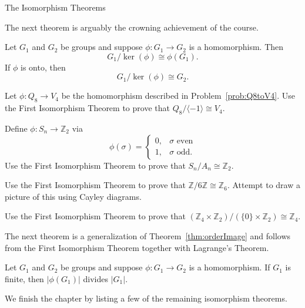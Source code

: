 \begin{section}{The Isomorphism Theorems}

The next theorem is arguably the crowning achievement of the course.

\begin{theorem}
Let $G_1$ and $G_2$ be groups and suppose $\phi:G_1\to G_2$ is a homomorphism. Then
\[
G_1/\ker(\phi)\cong \phi(G_1).
\]
If $\phi$ is onto, then
\[
G_1/\ker(\phi)\cong G_2.
\]
\end{theorem}

\begin{problem}
Let $\phi:Q_8\to V_4$ be the homomorphism described in Problem~\ref{prob:Q8toV4}. Use the First Isomorphism Theorem to prove that $Q_8/\langle-1\rangle\cong V_4$.
\end{problem}

\begin{problem}
Define $\phi:S_n\to \mathbb{Z}_2$ via
\[
\phi(\sigma)=\begin{cases}
0, & \sigma \text{ even}\\
1, & \sigma \text{ odd}.
\end{cases}
\]
Use the First Isomorphism Theorem to prove that $S_n/A_n\cong \mathbb{Z}_2$.
\end{problem}

\begin{problem}
Use the First Isomorphism Theorem to prove that $\mathbb{Z}/6\mathbb{Z}\cong \mathbb{Z}_6$.  Attempt to draw a picture of this using Cayley diagrams.
\end{problem}

\begin{problem}
Use the First Isomorphism Theorem to prove that $(\mathbb{Z}_4\times \mathbb{Z}_2)/(\{0\}\times \mathbb{Z}_2)\cong \mathbb{Z}_4$.
\end{problem}

The next theorem is a generalization of Theorem~\ref{thm:orderImage} and follows from the First Isomorphism Theorem together with Lagrange's Theorem.

\begin{theorem}
Let $G_1$ and $G_2$ be groups and suppose $\phi:G_1\to G_2$ is a homomorphism. If $G_1$ is finite, then $|\phi(G_1)|$ divides $|G_1|$.
\end{theorem}

We finish the chapter by listing a few of the remaining isomorphism theorems.%


\end{section}
